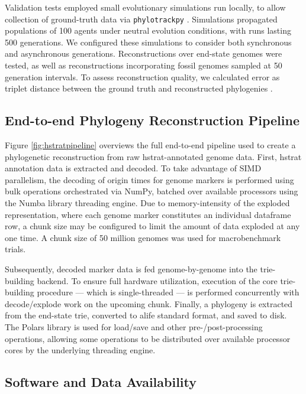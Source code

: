 Validation tests employed small evolutionary simulations run locally, to allow collection of ground-truth data via \texttt{phylotrackpy} \citep{dolson2024phylotrack}.
Simulations propagated populations of 100 agents under neutral evolution conditions, with runs lasting 500 generations.
We configured these simulations to consider both synchronous and asynchronous generations.
Reconstructions over end-state genomes were tested, as well as reconstructions incorporating fossil genomes sampled at 50 generation intervals.
To assess reconstruction quality, we calculated error as triplet distance between the ground truth and reconstructed phylogenies \citep{critchlow1996triples}.

\subsection{End-to-end Phylogeny Reconstruction Pipeline}
\label{sec:pipeline}



Figure \ref{fig:hstratpipeline} overviews the full end-to-end pipeline used to create a phylogenetic reconstruction from raw hstrat-annotated genome data.
First, hstrat annotation data is extracted and decoded.
To take advantage of SIMD parallelism, the decoding of origin times for genome markers is performed using bulk operations orchestrated via NumPy, batched over available processors using the Numba library threading engine.
Due to memory-intensity of the exploded representation, where each genome marker constitutes an individual dataframe row, a chunk size may be configured to limit the amount of data exploded at any one time.
A chunk size of 50 million genomes was used for macrobenchmark trials.

Subsequently, decoded marker data is fed genome-by-genome into the trie-building backend.
To ensure full hardware utilization, execution of the core trie-building procedure --- which is single-threaded --- is performed concurrently with decode/explode work on the upcoming chunk.
Finally, a phylogeny is extracted from the end-state trie, converted to alife standard format, and saved to disk.
The Polars library is used for load/save and other pre-/post-processing operations, allowing some operations to be distributed over available processor cores by the underlying threading engine.

\subsection{Software and Data Availability} \label{sec:materials}

